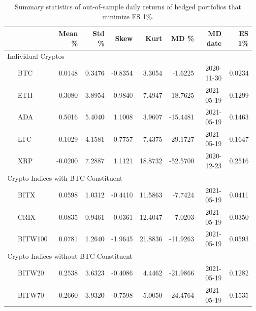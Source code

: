 \documentclass[11pt,a4paper,english]{article}
\begin{document}
{\begin{table}[!]
\end{table}\begin{table}[!] \centering %
  {%
\begin{tabular}{lrrrrrrr} \toprule
         {} &    Mean \% &     Std \% &      Skew &       Kurt &         MD \% &     MD date & ES 1\% \\
\midrule
     \multicolumn{7}{l}{Individual Cryptos}                                                                                 \\
\ \ \ BTC     &  0.0148 &  0.3476 & -0.8354 &   3.3054 &  -1.6225 &  2020-11-30 &  0.0234 \\
\ \ \ ETH     &  0.3080 &  3.8954 &  0.9840 &   7.4947 & -18.7625 &  2021-05-19 &  0.1299 \\
\ \ \ ADA     &  0.5016 &  5.4040 &  1.1008 &   3.9607 & -15.4481 &  2021-05-19 &  0.1463 \\
\ \ \ LTC     & -0.1029 &  4.1581 & -0.7757 &   7.4375 & -29.1727 &  2021-05-19 &  0.1647 \\
\ \ \ XRP     & -0.0200 &  7.2887 &  1.1121 &  18.8732 & -52.5700 &  2020-12-23 &  0.2516 \\
   \multicolumn{7}{l}{Crypto Indices with BTC Constituent}                                                                  \\
\ \ \ BITX    &  0.0598 &  1.0312 & -0.4410 &  11.5863 &  -7.7424 &  2021-05-19 &  0.0411 \\
\ \ \ CRIX    &  0.0835 &  0.9461 & -0.0361 &  12.4047 &  -7.0203 &  2021-05-19 &  0.0350 \\
\ \ \ BITW100 &  0.0781 &  1.2640 & -1.9645 &  21.8836 & -11.9263 &  2021-05-19 &  0.0593 \\
    \multicolumn{7}{l}{Crypto Indices without BTC Constituent}                                                              \\
\ \ \ BITW20  &  0.2538 &  3.6323 & -0.4086 &   4.4462 & -21.9866 &  2021-05-19 &  0.1282 \\
\ \ \ BITW70  &  0.2660 &  3.9320 & -0.7598 &   5.0050 & -24.4764 &  2021-05-19 &  0.1535 \\
\bottomrule
\end{tabular}
}
\caption{Summary statistics of out-of-sample daily returns of hedged portfolios that minimize ES 1\%.}
\label{tab:ES1_rh}


\end{table}}
\end{document}
